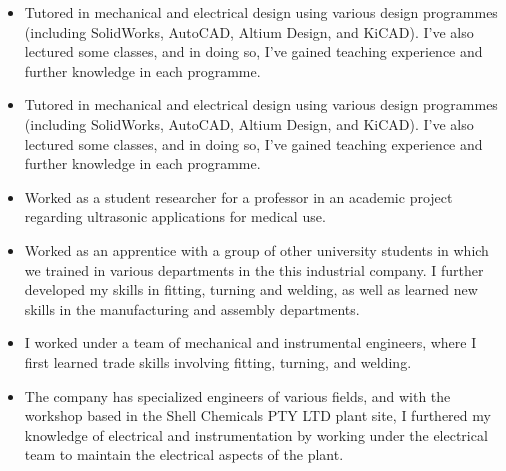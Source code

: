 \documentclass[10pt,a4paper]{altacv}
\begin{document}
\divider


\begin{itemize}
\item Tutored in mechanical and electrical design using various design programmes (including SolidWorks, AutoCAD, Altium Design, and KiCAD). I’ve also lectured some classes, and in doing so, I’ve gained teaching experience and further knowledge in each programme.
\item Tutored in mechanical and electrical design using various design programmes (including SolidWorks, AutoCAD, Altium Design, and KiCAD). I’ve also lectured some classes, and in doing so, I’ve gained teaching experience and further knowledge in each programme.


\end{itemize}


\divider


\begin{itemize}
\item Worked as a student researcher for a professor in an academic project regarding ultrasonic applications for medical use.


\end{itemize}


\divider


\begin{itemize}
\item Worked as an apprentice with a group of other university students in which we trained in various departments in the this industrial company. I further developed my skills in fitting, turning and welding, as well as learned new skills in the manufacturing and assembly departments.


\end{itemize}


\divider


\begin{itemize}
\item I worked under a team of mechanical and instrumental engineers, where I first learned trade skills involving fitting, turning, and welding.
\item The company has specialized engineers of various fields, and with the workshop based in the Shell Chemicals PTY LTD plant site, I furthered my knowledge of electrical and instrumentation by working under the electrical team to maintain the electrical aspects of the plant.


\end{itemize}
\end{document}
